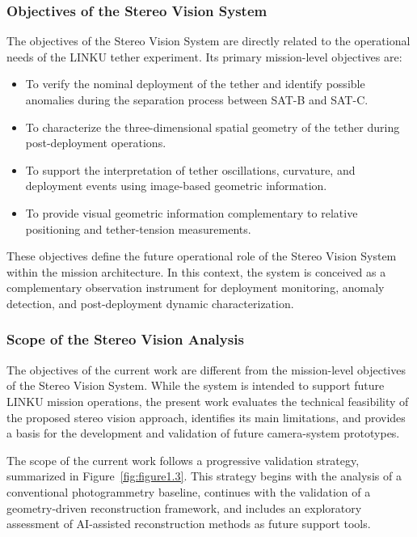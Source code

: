 \newpage
\subsubsection{Objectives of the Stereo Vision System}
\label{subsub:stereo_vision_objectives}

The objectives of the Stereo Vision System are directly related to the operational needs of the LINKU tether experiment. Its primary mission-level objectives are:

\begin{itemize}
    \item To verify the nominal deployment of the tether and identify possible anomalies during the separation process between SAT-B and SAT-C.
    \item To characterize the three-dimensional spatial geometry of the tether during post-deployment operations.
    \item To support the interpretation of tether oscillations, curvature, and deployment events using image-based geometric information.
    \item To provide visual geometric information complementary to relative positioning and tether-tension measurements.
\end{itemize}

These objectives define the future operational role of the Stereo Vision System within the mission architecture. In this context, the system is conceived as a complementary observation instrument for deployment monitoring, anomaly detection, and post-deployment dynamic characterization.

\subsubsection{Scope of the Stereo Vision Analysis}
\label{subsub:stereo_vision_current_work_scope}

The objectives of the current work are different from the mission-level objectives of the Stereo Vision System. While the system is intended to support future LINKU mission operations, the present work evaluates the technical feasibility of the proposed stereo vision approach, identifies its main limitations, and provides a basis for the development and validation of future camera-system prototypes.

The scope of the current work follows a progressive validation strategy, summarized in Figure~\ref{fig:figure1.3}. This strategy begins with the analysis of a conventional photogrammetry baseline, continues with the validation of a geometry-driven reconstruction framework, and includes an exploratory assessment of AI-assisted reconstruction methods as future support tools.

